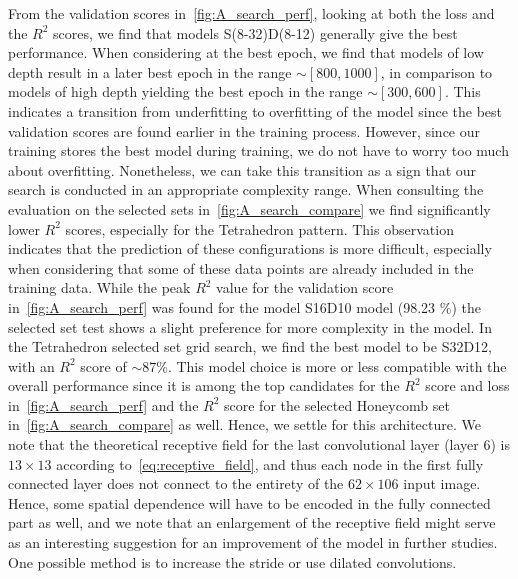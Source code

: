 From the validation scores in~\cref{fig:A_search_perf}, looking at both the loss
and the $R^2$ scores, we find that models S(8-32)D(8-12) generally give the best
performance. When considering at the best epoch, we find that models of low depth
result in a later best epoch in the range $\sim [800, 1000]$, in comparison to
models of high depth yielding the best epoch in the range $\sim [300, 600]$.
This indicates a transition from underfitting to overfitting of the model since
the best validation scores are found earlier in the training process. However,
since our training stores the best model during training, we do not have to
worry too much about overfitting. Nonetheless, we can take this transition as a
sign that our search is conducted in an appropriate complexity range. When
consulting the evaluation on the selected sets in~\cref{fig:A_search_compare} we
find significantly lower $R^2$ scores, especially for the Tetrahedron pattern.
This observation indicates that the prediction of these configurations is more
difficult, especially when considering that some of these data points are already included in the
training data. While the peak $R^2$ value for the validation score
in~\cref{fig:A_search_perf} was found for the model S16D10 model (98.23 \%) the
selected set test shows a slight preference for more complexity in the model. In
the Tetrahedron selected set grid search, we find the best model to be S32D12,
with an $R^2$ score of $\sim 87 \%$. This model choice is more or less
compatible with the overall performance since it is among the top candidates for
the $R^2$ score and loss in~\cref{fig:A_search_perf} and the $R^2$ score for the
selected Honeycomb set in~\cref{fig:A_search_compare} as well. Hence, we settle
for this architecture. We note that the theoretical receptive field for the last
convolutional layer (layer 6) is $13 \times 13$ according to~\cref{eq:receptive_field}, and thus each node in the first fully connected
layer does not connect to the entirety of the $62\times106$ input image. Hence,
some spatial dependence will have to be encoded in the fully connected part as
well, and we note that an enlargement of the receptive field might serve as an interesting suggestion for an improvement of the model in further studies. One possible method is to increase the stride or use dilated convolutions.

